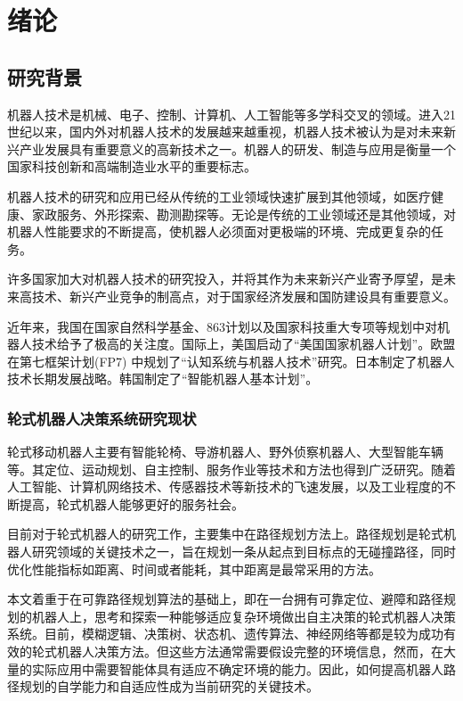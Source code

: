 ﻿\chapter{绪论}\label{preface}

\section{研究背景}
机器人技术是机械、电子、控制、计算机、人工智能等多学科交叉的领域。进入21世纪以来，国内外对机器人技术的发展越来越重视，机器人技术被认为是对未来新兴产业发展具有重要意义的高新技术之一\cite{1}。机器人的研发、制造与应用是衡量一个国家科技创新和高端制造业水平的重要标志。

机器人技术的研究和应用已经从传统的工业领域快速扩展到其他领域，如医疗健康、家政服务、外形探索、勘测勘探等。无论是传统的工业领域还是其他领域，对机器人性能要求的不断提高，使机器人必须面对更极端的环境、完成更复杂的任务。

许多国家加大对机器人技术的研究投入，并将其作为未来新兴产业寄予厚望，是未来高技术、新兴产业竞争的制高点，对于国家经济发展和国防建设具有重要意义。

近年来，我国在国家自然科学基金、863计划以及国家科技重大专项等规划中对机器人技术给予了极高的关注度。国际上，美国启动了“美国国家机器人计划”\cite{2}。欧盟在第七框架计划(FP7) 中规划了“认知系统与机器人技术”研究。日本制定了机器人技术长期发展战略。韩国制定了“智能机器人基本计划”。

\subsection{轮式机器人决策系统研究现状}
轮式移动机器人主要有智能轮椅、导游机器人、野外侦察机器人、大型智能车辆等。其定位、运动规划、自主控制、服务作业等技术和方法也得到广泛研究。随着人工智能、计算机网络技术、传感器技术等新技术的飞速发展，以及工业程度的不断提高，轮式机器人能够更好的服务社会。

目前对于轮式机器人的研究工作，主要集中在路径规划方法上。路径规划是轮式机器人研究领域的关键技术之一，旨在规划一条从起点到目标点的无碰撞路径，同时优化性能指标如距离、时间或者能耗，其中距离是最常采用的方法\cite{3}。

本文着重于在可靠路径规划算法的基础上，即在一台拥有可靠定位、避障和路径规划的机器人上，思考和探索一种能够适应复杂环境做出自主决策的轮式机器人决策系统。目前，模糊逻辑\cite{4}、决策树\cite{5}、状态机、遗传算法\cite{6}、神经网络\cite{7}等都是较为成功有效的轮式机器人决策方法。但这些方法通常需要假设完整的环境信息，然而，在大量的实际应用中需要智能体具有适应不确定环境的能力。因此，如何提高机器人路径规划的自学能力和自适应性成为当前研究的关键技术。

